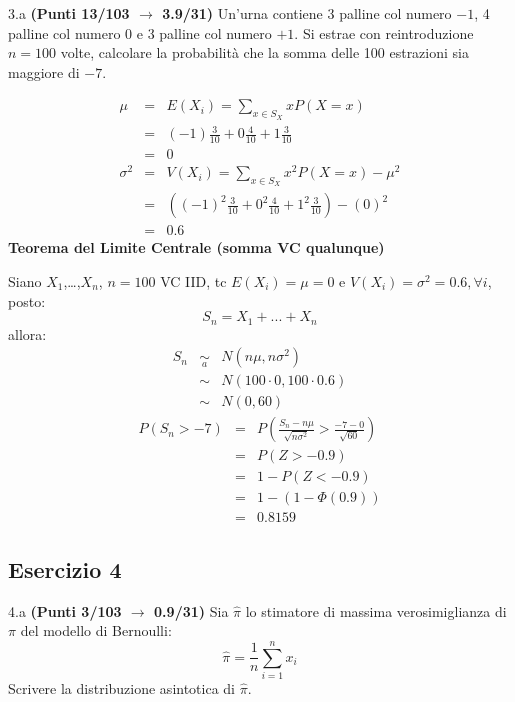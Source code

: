 \documentclass[
  11pt,
]{book}
\theoremstyle{mytheoremstyle}
\theoremstyle{mydefstyle}
\newenvironment{sol}
  {
  \begin{tcolorbox}[enhanced,breakable,arc=0.1mm,boxrule=1pt,colback=white,colframe=iblue,
  title=\bf \fontfamily{lmss}\selectfont \hspace{.5 cm} Soluzione,drop fuzzy shadow]

}{
\end{tcolorbox}
  }
\begin{document}
3.a \textbf{(Punti 13/103 \(\rightarrow\) 3.9/31)} Un'urna contiene 3 palline col numero \(-1\), 4 palline col numero \(0\) e 3 palline
col numero \(+1\). Si estrae con reintroduzione \(n=100\) volte, calcolare la probabilità che la somma delle 100 estrazioni sia maggiore di \(-7\).

\begin{sol}
\begin{eqnarray*} \mu &=& E(X_i) = \sum_{x\in S_X}x P(X=x)\\ 
 &=& ( -1 ) \frac { 3 }{ 10 }+ 0  \frac { 4 }{ 10 }+ 1  \frac { 3 }{ 10 } \\ 
            &=& 0 \\ 
 \sigma^2 &=& V(X_i) = \sum_{x\in S_X}x^2 P(X=x)-\mu^2\\ 
 &=&\left( ( -1 ) ^2\frac { 3 }{ 10 }+ 0  ^2\frac { 4 }{ 10 }+ 1  ^2\frac { 3 }{ 10 } \right)-( 0 )^2\\ 
            &=& 0.6 
\end{eqnarray*}
\textbf{Teorema del Limite Centrale (somma VC qualunque)}

Siano \(X_1\),\ldots,\(X_n\), \(n=100\) VC IID, tc \(E(X_i)=\mu=0\) e \(V(X_i)=\sigma^2=0.6,\forall i\), posto:
\[
      S_n = X_1 + ... + X_n
      \]
allora:\begin{eqnarray*}
  S_n & \mathop{\sim}\limits_{a}& N(n\mu,n\sigma^2) \\
     &\sim & N(100\cdot0,100\cdot0.6) \\
     &\sim & N(0,60) 
  \end{eqnarray*}\begin{eqnarray*}
      P( S_n   >   -7 ) 
        &=& P\left(  \frac { S_n  -  n\mu }{ \sqrt{n\sigma^2} }  >  \frac { -7  -  0 }{\sqrt{ 60 }} \right)  \\
                 &=& P\left(  Z   >   -0.9 \right) \\    &=& 1-P(Z< -0.9 )\\ 
                 &=&  1-(1-\Phi( 0.9 )) \\ &=&  0.8159 
      \end{eqnarray*}

\end{sol}

\subsection{Esercizio 4}\label{esercizio-4-46}

4.a \textbf{(Punti 3/103 \(\rightarrow\) 0.9/31)} Sia \(\hat \pi\) lo stimatore di massima verosimiglianza di \(\pi\) del modello di Bernoulli:
\[\hat\pi =  \frac 1n\sum_{i=1}^n x_i\]
Scrivere la distribuzione asintotica di \(\hat \pi\).
\end{document}
